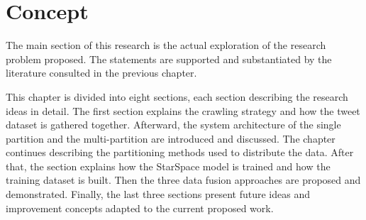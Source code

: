 \chapter{Concept}

The main section of this research is the actual exploration of the research problem proposed. The statements are supported and substantiated by the literature consulted in the previous chapter.

This chapter is divided into eight sections, each section describing the research ideas in detail. The first section explains the crawling strategy and how the tweet dataset is gathered together. Afterward, the system architecture of the single partition and the multi-partition are introduced and discussed. The chapter continues describing the partitioning methods used to distribute the data. After that, the section explains how the StarSpace model is trained and how the training dataset is built. Then the three data fusion approaches are proposed and demonstrated. Finally, the last three sections present future ideas and improvement concepts adapted to the current proposed work.
